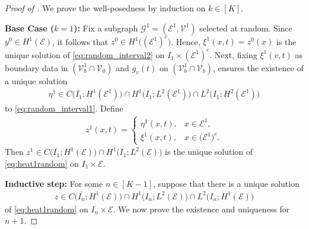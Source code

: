 \documentclass[10pt,a4paper]{amsart}
\begin{document}
\begin{proof}[Proof of ]
We prove the well-posedness by induction on $k \in [K]$.

\smallbreak

\noindent
\textbf{Base Case ($k = 1$):} Fix a subgraph $\mathcal{G}^1 = (\mathcal{E}^1, \mathcal{V}^1)$ selected at random. Since $y^0 \in H^1(\mathcal{E})$, it follows that $z^0 \in H^1\bigl((\mathcal{E}^1)^c\bigr)$. Hence, $\xi^1(x,t) = z^0(x)$ is the unique solution of \eqref{eq:random_interval2} on $I_1 \times (\mathcal{E}^1)^c$. Next, fixing  $\xi^1(v,t)$ as boundary data in $(\mathcal{V}_b^1 \cap \mathcal{V}_0)$ and $g_v(t)$ on $(\mathcal{V}_b^1 \cap \mathcal{V}_b)$,  ensures the existence of a unique solution
\begin{align*}
  \eta^1 \in C\bigl(\overline{I_1}; H^1(\mathcal{E}^1)\bigr) 
  \cap
  H^1\bigl(I_1; L^2(\mathcal{E}^1)\bigr)
  \cap
  L^2\bigl(I_1; H^2(\mathcal{E}^1)\bigr)
\end{align*}
to \eqref{eq:random_interval1}. Define
\begin{align*}
  z^1(x,t)
  =
  \begin{cases}
    \eta^1(x,t), & x \in \mathcal{E}^1, \\
    \xi^1(x,t),    & x \in \bigl(\mathcal{E}^1\bigr)^c.
  \end{cases}
\end{align*}
Then $z^1\in 
  C\bigl(\overline{I_1}; H^1(\mathcal{E})\bigr)
  \cap
  H^1\bigl(I_1; L^2(\mathcal{E})\bigr)$ is the unique solution of \eqref{eq:heat1random} on $I_1 \times \mathcal{E}$.

\smallbreak

\noindent
\textbf{Inductive step:} 
For some $n\in [K-1]$, suppose that there is a unique solution
\begin{align*}
  z \in 
  C\bigl(\overline{I_n}; H^1(\mathcal{E})\bigr)
  \cap
  H^1\bigl(I_n; L^2(\mathcal{E})\bigr)
  \cap
  L^2\bigl(I_n; H^1(\mathcal{E})\bigr)
\end{align*}
of \eqref{eq:heat1random} on $I_n \times \mathcal{E}$. We now prove the existence and uniqueness for $n+1$.


\end{proof}
\end{document}
